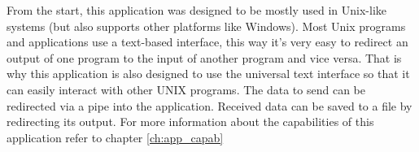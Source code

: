 From the start, this application was designed to be mostly used in Unix-like systems (but also supports other platforms like Windows). Most Unix programs and applications use a text-based interface, this way it's very easy to redirect an output of one program to the input of another program and vice versa. That is why this application is also designed to use the universal text interface so that it can easily interact with other UNIX programs. The data to send can be redirected via a pipe into the application. Received data can be saved to a file by redirecting its output. For more information about the capabilities of this application refer to chapter \ref{ch:app_capab}

